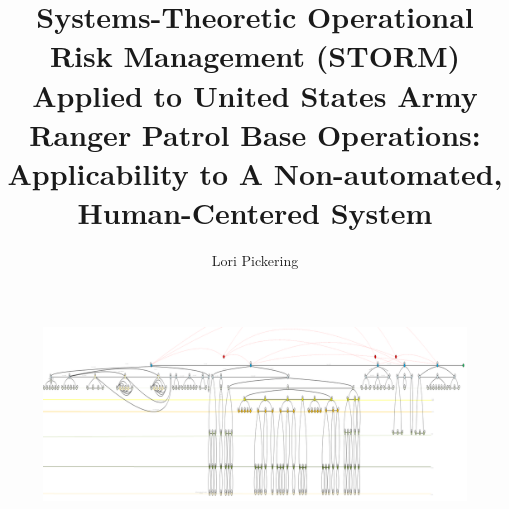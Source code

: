 \documentclass[hidelinks,12pt,a4paper]{report}
\begin{document}
\lstset{language=ML, basicstyle=\scriptsize}
\title{Systems-Theoretic Operational Risk Management (STORM) Applied to United States Army Ranger Patrol Base Operations: Applicability to A Non-automated, Human-Centered System}
\author{Lori Pickering}




\maketitle
\begin{figure}
\includegraphics[width=\textwidth]{../figures/overalldiagramsquashed.png}
\end{figure}


\begin{doublespace}
\cleardoublepage {}
{}

\setcounter{page}{1}
\end{doublespace}
\cleardoublepage {}

\tableofcontents
\cleardoublepage



\hypersetup{
  colorlinks   = true, %
  urlcolor     = blue, %
  linkcolor    = blue, %
  citecolor   = red %
}

\cleardoublepage {}
\listoffigures

\cleardoublepage {}
\listoftables

\cleardoublepage
%
\printnoidxglossary[type=\acronymtype, title={List of Acronyms}]
\cleardoublepage
\end{document}
